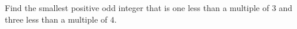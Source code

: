Find the smallest positive odd integer that is one less than a multiple of $3$ and three less than a multiple of $4$.
